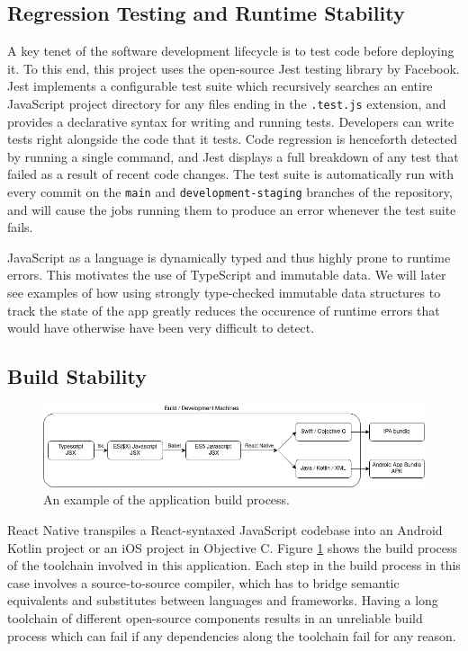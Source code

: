 \subsection{Regression Testing and Runtime Stability}
A key tenet of the software development lifecycle is to test code before deploying it. To this end, this project uses the open-source Jest testing library by Facebook. Jest implements a configurable test suite which recursively searches an entire JavaScript project directory for any files ending in the \texttt{.test.js} extension, and provides a declarative syntax for writing and running tests. Developers can write tests right alongside the code that it tests. Code regression is henceforth detected by running a single command, and Jest displays a full breakdown of any test that failed as a result of recent code changes. The test suite is automatically run with every commit on the \texttt{main} and \texttt{development-staging} branches of the repository, and will cause the jobs running them to produce an error whenever the test suite fails.

JavaScript as a language is dynamically typed and thus highly prone to runtime errors. This motivates the use of TypeScript and immutable data. We will later see examples of how using strongly type-checked immutable data structures to track the state of the app greatly reduces the occurence of runtime errors that would have otherwise have been very difficult to detect.


\subsection{Build Stability}
\begin{figure}[h]
    \begin{center}
        \includegraphics[scale=0.55]{images/app_build_path.png}
    \end{center}
    \caption{An example of the application build process.}
    \label{fig:app_build_process}
\end{figure}

React Native transpiles a React-syntaxed JavaScript codebase into an Android Kotlin project or an iOS project in Objective C. Figure \ref{fig:app_build_process} shows the build process of the toolchain involved in this application. Each step in the build process in this case involves a source-to-source compiler, which has to bridge semantic equivalents and substitutes between languages and frameworks. Having a long toolchain of different open-source components results in an unreliable build process which can fail if any dependencies along the toolchain fail for any reason.


